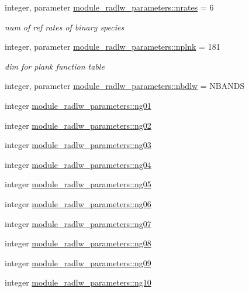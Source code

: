 \begin{DoxyCompactItemize}
integer, parameter \hyperlink{group__module__radlw__main_ga86288e4bbe3d6962505488790ff42bfa}{module\+\_\+radlw\+\_\+parameters\+::nrates} = 6
\begin{DoxyCompactList}\small\item\em num of ref rates of binary species \end{DoxyCompactList}\item 
integer, parameter \hyperlink{group__module__radlw__main_ga7ade2de4de94ec6e7a0e97321143e2e6}{module\+\_\+radlw\+\_\+parameters\+::nplnk} = 181
\begin{DoxyCompactList}\small\item\em dim for plank function table \end{DoxyCompactList}\item 
integer, parameter \hyperlink{group__module__radlw__main_ga39a115a97296886b2e6e37b220e942c7}{module\+\_\+radlw\+\_\+parameters\+::nbdlw} = N\+B\+A\+N\+DS
\item 
integer \hyperlink{group__module__radlw__main_ga54dc7913677d754af2b7ece9732b1280}{module\+\_\+radlw\+\_\+parameters\+::ng01}
\item 
integer \hyperlink{group__module__radlw__main_gaed66d66a4da744d27c13b57b41ba78c3}{module\+\_\+radlw\+\_\+parameters\+::ng02}
\item 
integer \hyperlink{group__module__radlw__main_gad226d9951e041e991f463a9a90e7f68b}{module\+\_\+radlw\+\_\+parameters\+::ng03}
\item 
integer \hyperlink{group__module__radlw__main_gafd05a94bc29e5a5d792c0c140fe3a0c4}{module\+\_\+radlw\+\_\+parameters\+::ng04}
\item 
integer \hyperlink{group__module__radlw__main_ga1e70690afc3ba2cca4344d6df3d26ee8}{module\+\_\+radlw\+\_\+parameters\+::ng05}
\item 
integer \hyperlink{group__module__radlw__main_ga9a176786a0df1e65165db9b3c6f0e582}{module\+\_\+radlw\+\_\+parameters\+::ng06}
\item 
integer \hyperlink{group__module__radlw__main_gab8f22f9ceabf3946452055c461476d49}{module\+\_\+radlw\+\_\+parameters\+::ng07}
\item 
integer \hyperlink{group__module__radlw__main_ga61aba0726187e15acf8bae5c377dbdd5}{module\+\_\+radlw\+\_\+parameters\+::ng08}
\item 
integer \hyperlink{group__module__radlw__main_ga2856b7576a44f2e35bd0fbc1e49bd270}{module\+\_\+radlw\+\_\+parameters\+::ng09}
\item 
integer \hyperlink{group__module__radlw__main_gaa764831e931a2ec27c763ebf957bbc67}{module\+\_\+radlw\+\_\+parameters\+::ng10}

\end{DoxyCompactItemize}
